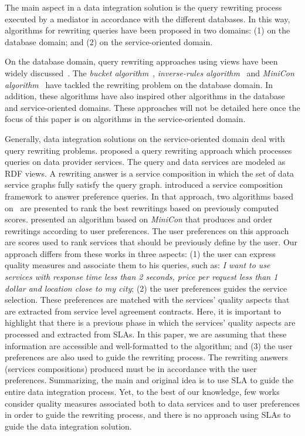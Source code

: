 The main aspect in a data integration solution is 
the query rewriting process executed by a mediator
in accordance with the different databases.
%
In this way, algorithms for rewriting queries have
been proposed in two domains: (1) on the database 
domain; and (2) on the service-oriented domain.

On the database domain, query rewriting approaches using
views have been widely discussed~\cite{Halevy:2001}.
%
The \textit{bucket algorithm}~\cite{Levy:1996}, 
\textit{inverse-rules algorithm}~\cite{Duschka:1997} and 
\textit{MiniCon algorithm}~\cite{Pottinger:2001} have
tackled the rewriting problem on the database domain.
%
In addition, these algorithms have also inspired other
algorithms in the database and service-oriented domains.
These approaches will not be detailed here once the focus
of this paper is on algorithms in the service-oriented domain.

Generally, data integration solutions on the 
service-oriented domain deal with query rewriting problems.
%
\cite{Barhamgi2010} proposed a query rewriting approach 
which processes queries on data provider services.
The query and data services are modeled as RDF views.
A rewriting answer is a service composition in which 
the set of data service graphs fully satisfy the query graph.  
%
\cite{Benouaret2011} introduced a service composition
framework to answer preference queries. In that approach, two algorithms based
on~\cite{Barhamgi2010} are presented to rank the best rewritings based on previously computed scores.
%
\cite{ba2014} presented an algorithm based on \textit{MiniCon} 
that produces and order rewritings according to user preferences. 
The user preferences on this approach are scores used to rank 
services that should be previously define by the user.
%
Our approach differs from these works in three aspects:
(1) the user can express quality measures and associate them
to his queries, such as: \textit{I want to use services with response
time less than 2 seconds, price per request less than 1 dollar
and location close to my city}; 
(2) the user preferences guides the service selection. 
These preferences are matched with the services' quality aspects
that are extracted from service level agreement contracts.
Here, it is important to highlight that there
is a previous phase in which the services' quality aspects are 
processed and extracted from SLAs. 
In this paper, we are assuming that these information are accessible and
well-formatted to the algorithm; and
(3) the user preferences are also used to guide the rewriting process.
The rewriting answers (services compositions) produced must be in 
accordance with the user preferences.
%
Summarizing, the main and original idea is to use SLA to guide
the entire data integration process.
Yet, to the best of our knowledge, few works consider quality
measures associated both to data services and to user preferences in order to
guide the rewriting process, and there is no approach using SLAs to guide the
data integration solution. 
     